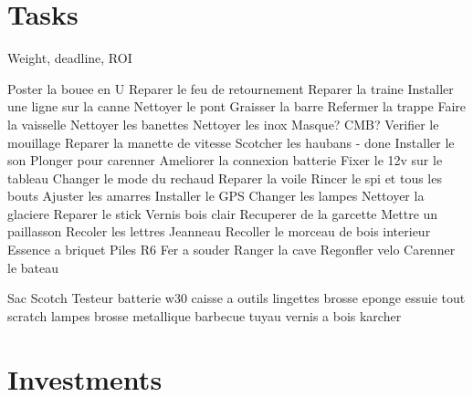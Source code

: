 \documentclass[8pt]{article} %
\begin{document}




\section{Tasks}

Weight, deadline, ROI

Poster la bouee en U
Reparer le feu de retournement
Reparer la traine
Installer une ligne sur la canne
Nettoyer le pont
Graisser la barre
Refermer la trappe
Faire la vaisselle
Nettoyer les banettes
Nettoyer les inox
Masque? CMB?
Verifier le mouillage
Reparer la manette de vitesse
Scotcher les haubans - done
Installer le son
Plonger pour carenner
Ameliorer la connexion batterie
Fixer le 12v sur le tableau
Changer le mode du rechaud
Reparer la voile
Rincer le spi et tous les bouts
Ajuster les amarres
Installer le GPS
Changer les lampes
Nettoyer la glaciere
Reparer le stick
Vernis bois clair
Recuperer de la garcette
Mettre un paillasson
Recoler les lettres Jeanneau
Recoller le morceau de bois interieur
Essence a briquet
Piles R6
Fer a souder
Ranger la cave
Regonfler velo
Carenner le bateau


Sac
Scotch
Testeur batterie
w30
caisse a outils
lingettes
brosse
eponge
essuie tout
scratch
lampes
brosse metallique
barbecue
tuyau
vernis a bois
karcher

\section{Investments}
\end{document}

